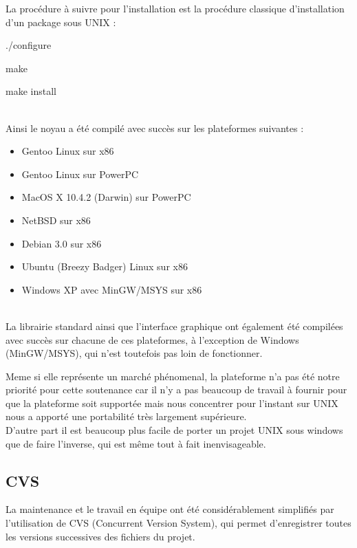 \documentclass[14pt,a4paper]{report}
\begin{document}
La proc\'edure \`a suivre pour l'installation est la proc\'edure classique
d'installation d'un package sous UNIX : \\
{\tt

  ./configure

  make

  make install

}
\rule{0cm}{0cm} \\

Ainsi le noyau a \'et\'e compil\'e avec succ\`es sur les
plateformes suivantes :
\begin{itemize}
\item{Gentoo Linux sur x86}
\item{Gentoo Linux sur PowerPC}
\item{MacOS X 10.4.2 (Darwin) sur PowerPC}
\item{NetBSD sur x86}
\item{Debian 3.0 sur x86}
\item{Ubuntu (Breezy Badger) Linux sur x86}
\item{Windows XP avec MinGW/MSYS sur x86}
\end{itemize}
\rule{0cm}{1mm} \\

La librairie standard ainsi que l'interface graphique ont \'egalement
\'et\'e compil\'ees avec succ\`es sur chacune de ces plateformes, \`a
l'exception de Windows (MinGW/MSYS), qui n'est toutefois pas loin de
fonctionner.

Meme si elle repr\'esente un march\'e ph\'enomenal, 
la plateforme n'a pas \'et\'e notre priorit\'e pour cette soutenance
car il n'y a pas beaucoup de travail \`a fournir pour que
la plateforme soit support\'ee
mais nous concentrer pour l'instant sur UNIX nous a apport\'e
une portabilit\'e tr\`es largement sup\'erieure. \\

D'autre part il est beaucoup plus facile de porter un projet UNIX
sous windows que de faire l'inverse, qui est m\^eme tout \`a fait
inenvisageable. \\


\newpage

\subsection{CVS}

La maintenance et le travail en \'equipe ont \'et\'e
consid\'erablement simplifi\'es par
l'utilisation de CVS (Concurrent Version System),
qui permet d'enregistrer toutes les versions
successives des fichiers du projet.
\end{document}
